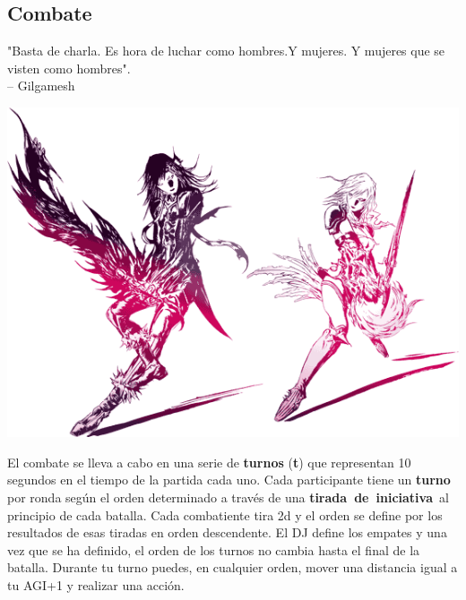 \subsection*{\hypertarget{combat}{Combate}}
%
"Basta de charla. Es hora de luchar como hombres.\newline Y mujeres. Y mujeres que se visten como hombres".\\
\indent -- Gilgamesh 
%
\begin{center} \includegraphics[width=1\columnwidth]{./art/images/ff13-2.png} \end{center}
%
\vspace{0.5cm}
%
El combate se lleva a cabo en una serie de \textbf{turnos} (\textbf{t}) que representan 10 segundos en el tiempo de la partida cada uno.
Cada participante tiene un \textbf{turno }por ronda según el orden determinado a través de una \mbox{\textbf{tirada de iniciativa }}al principio de cada batalla. Cada combatiente tira 2d y el orden se define por los resultados de esas tiradas en orden descendente. El DJ define los empates y una vez que se ha definido, el orden de los turnos no cambia hasta el final de la batalla. Durante tu turno puedes, en cualquier orden, mover una distancia igual a tu AGI+1 y realizar una acción.
%
\vfill
%
